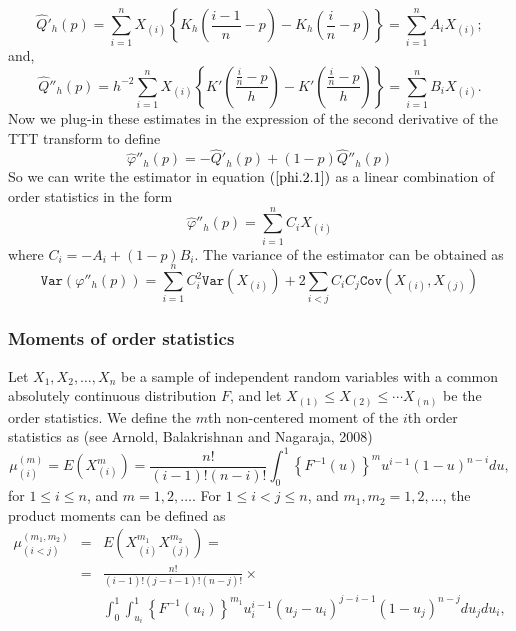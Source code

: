 \documentclass[preprint,12pt]{elsarticle}
\begin{document}
\begin{equation}\label{kernel.dQ}
\widehat{Q}'_h(p)=\sum_{i=1}^n X_{(i)}\left\{K_h\left(\frac{i-1}{n}-p\right)-K_h\left(\frac{i}{n}-p\right)\right\}=\sum_{i=1}^n A_iX_{(i)};
\end{equation}
and,
\begin{equation}\label{kernel.d2Q}
\widehat{Q}''_h(p)=h^{-2}\sum_{i=1}^n X_{(i)}\left\{K'\left(\frac{\frac{i}{n}-p}{h}\right)-K'\left(\frac{\frac{i}{n}-p}{h}\right)\right\}=\sum_{i=1}^n B_iX_{(i)}.
\end{equation}
Now we plug-in these estimates in the expression of the second derivative of the TTT transform to define
\begin{equation}\label{phi.2.1}
\widehat{\varphi}''_h(p)=-\widehat{Q}'_h(p)+(1-p)\widehat{Q}''_h(p)
\end{equation}
So we can write the estimator in equation $(\ref{phi.2.1})$ as a linear combination of order statistics in the form
\begin{equation}\label{phi.2.2}
\widehat{\varphi}''_h(p)=\sum_{i=1}^n C_iX_{(i)}
\end{equation}
where $C_i=-A_i+(1-p)B_i$.
The variance of the estimator can be obtained as
\begin{equation}\label{var.phi}
\texttt{Var}\left(\varphi''_h(p)\right)=\sum_{i=1}^nC_i^2 \texttt{Var}\left(X_{(i)}\right)+2\underset{i<j}{\sum}C_iC_j\texttt{Cov}\left(X_{(i)},X_{(j)}\right)
\end{equation}

\subsubsection*{\textbf{Moments of order statistics}}

\noindent Let $X_1,X_2,\ldots, X_n$ be a sample of independent random variables with a common absolutely continuous distribution $F$, and let  $X_{(1)} \leq X_{(2)}\leq \cdots X_{(n)}$ be the order statistics. 
We define the $m$th non-centered moment of the $i$th order statistics as (see Arnold, Balakrishnan and Nagaraja, 2008)
\begin{equation}\label{mu.i}
\mu_{(i)}^{(m)}=E\left(X_{(i)}^m\right)=\frac{n!}{(i-1)!(n-i)!}\int_0^1\left\{F^{-1}(u)\right\}^m u^{i-1}(1-u)^{n-i}du,
\end{equation}
for $1\leq i \leq n$, and $m=1,2, \ldots$. For $1 \leq i < j \leq n$, and $m_1, m_2=1,2,\ldots$, the product moments can be defined as
\begin{eqnarray}\label{mu.ij}
\mu_{(i<j)}^{(m_1,m_2)}&=&E\left(X_{(i)}^{m_1}X_{(j)}^{m_2}\right)= \\
\nonumber &=&\frac{n!}{(i-1)!(j-i-1)!(n-j)!} \times \\
\nonumber \quad \quad \quad &&\int_0^1\int_{u_i}^1\left\{F^{-1}(u_i)\right\}^{m_1} u_i^{i-1}(u_j-u_i)^{j-i-1}(1-u_j)^{n-j}du_jdu_i,
\end{eqnarray}
\end{document}
